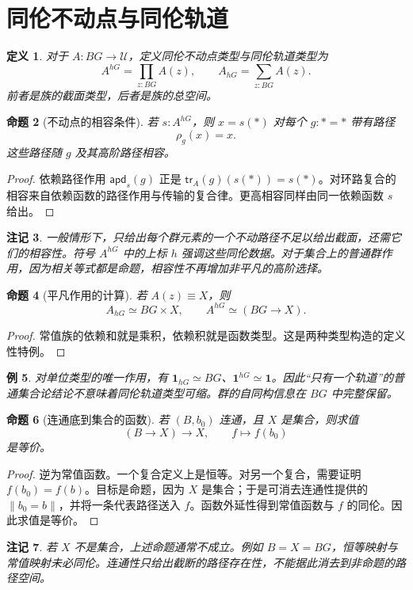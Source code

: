\documentclass[12pt,oneside,openany,fontset=none]{ctexbook}
\theoremstyle{cn}
\newtheorem{definition}{定义}[chapter]
\newtheorem{example}[definition]{例}
\newtheorem{proposition}[definition]{命题}
\newtheorem{remark}[definition]{注记}
\numberwithin{equation}{chapter}
\newcommand{\U}{\mathcal U}
\newcommand{\apd}{\mathsf{apd}}
\newcommand{\tr}{\mathsf{tr}}
\newcommand{\one}{\mathbf 1}
\newcommand{\trunc}[1]{\left\|#1\right\|}
\begin{document}
\section{同伦不动点与同伦轨道}
\begin{definition}
对于 $A:BG\to\U$，定义同伦不动点类型与同伦轨道类型为
\[
A^{hG}=\prod_{z:BG}A(z),
\qquad
A_{hG}=\sum_{z:BG}A(z).
\]
前者是族的截面类型，后者是族的总空间。
\end{definition}
\begin{proposition}[不动点的相容条件]
若 $s:A^{hG}$，则 $x=s(*)$ 对每个 $g:*=*$ 带有路径
\[
\rho_g(x)=x.
\]
这些路径随 $g$ 及其高阶路径相容。
\end{proposition}
\begin{proof}
依赖路径作用 $\apd_s(g)$ 正是 $\tr_A(g)(s(*))=s(*)$。对环路复合的相容来自依赖函数的路径作用与传输的复合律。更高相容同样由同一依赖函数 $s$ 给出。
\end{proof}
\begin{remark}
一般情形下，只给出每个群元素的一个不动路径不足以给出截面，还需它们的相容性。符号 $A^{hG}$ 中的上标 $h$ 强调这些同伦数据。对于集合上的普通群作用，因为相关等式都是命题，相容性不再增加非平凡的高阶选择。
\end{remark}
\begin{proposition}[平凡作用的计算]
若 $A(z)\equiv X$，则
\[
A_{hG}\simeq BG\times X,
\qquad
A^{hG}\simeq(BG\to X).
\]
\end{proposition}
\begin{proof}
常值族的依赖和就是乘积，依赖积就是函数类型。这是两种类型构造的定义性特例。
\end{proof}
\begin{example}
对单位类型的唯一作用，有 $\one_{hG}\simeq BG$、$\one^{hG}\simeq\one$。因此“只有一个轨道”的普通集合论结论不意味着同伦轨道类型可缩。群的自同构信息在 $BG$ 中完整保留。
\end{example}
\begin{proposition}[连通底到集合的函数]
若 $(B,b_0)$ 连通，且 $X$ 是集合，则求值
\[
(B\to X)\longrightarrow X,
\qquad f\longmapsto f(b_0)
\]
是等价。
\end{proposition}
\begin{proof}
逆为常值函数。一个复合定义上是恒等。对另一个复合，需要证明 $f(b_0)=f(b)$。目标是命题，因为 $X$ 是集合；于是可消去连通性提供的 $\trunc{b_0=b}$，并将一条代表路径送入 $f$。函数外延性得到常值函数与 $f$ 的同伦。因此求值是等价。
\end{proof}
\begin{remark}
若 $X$ 不是集合，上述命题通常不成立。例如 $B=X=BG$，恒等映射与常值映射未必同伦。连通性只给出截断的路径存在性，不能据此消去到非命题的路径空间。
\end{remark}
\end{document}
